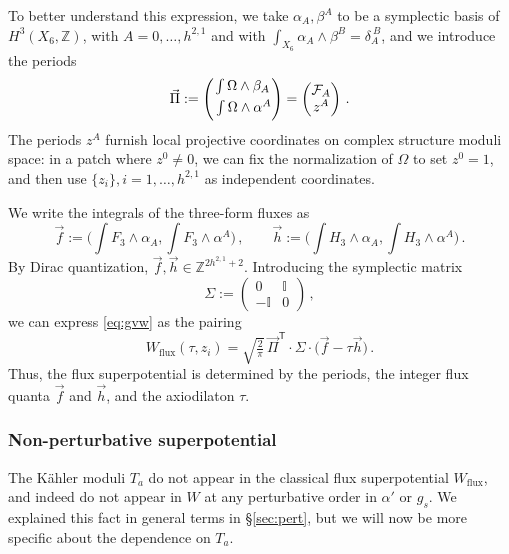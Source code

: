 \documentclass[12pt,a4wide]{article}
\begin{document}
To better understand this expression,
we take $\alpha_A, \beta^A$ to be a symplectic basis of $H^3(X_6,\mathbb{Z})$, with $A=0,\ldots, h^{2,1}$ and with $\int_{X_6}\alpha_A \wedge \beta^B = \delta_{A}^{~B}$, and
we introduce the periods
\begin{equation}\label{eq:perioddef}
\vec{\Pi}:=\begin{pmatrix}
\int\Omega\wedge \beta_A \\
\phantom{\Bigl.}\int\Omega\wedge \alpha^A
\end{pmatrix}=\begin{pmatrix}
\mathcal{F}_A\\
z^A
\end{pmatrix}\, .
\end{equation}
The periods $z^A$ furnish local projective coordinates on complex structure moduli space: in a patch where $z^0 \neq 0$, we can fix the normalization of $\Omega$ to set $z^0=1$, and then use $\{z_i\}, i=1,\ldots,h^{2,1}$ as independent coordinates.

We write the integrals of the three-form fluxes as
\begin{equation}\label{eq:fhdef}
    \vec{f} := \biggl(\int F_3 \wedge \alpha_A, \int F_3 \wedge \alpha^A\biggr)\,, \qquad  \vec{h} := \biggl(\int H_3 \wedge \alpha_A, \int H_3 \wedge \alpha^A\biggr)\,.
\end{equation}
By Dirac quantization, $\vec{f}, \vec{h} \in \mathbb{Z}^{2h^{2,1}+2}$.
Introducing the symplectic matrix
\begin{equation} \label{eq:sigdef}
\Sigma:=
\begin{pmatrix} 0 & {\mathbb{I}}\\
-{\mathbb{I}} & 0
\end{pmatrix}\,,
\end{equation}
we can express \eqref{eq:gvw} as the pairing
\begin{equation}\label{eq:fdotpi}
   W_{\text{flux}}(\tau,z_i) = \sqrt{\tfrac{2}{\pi}}\,\vec{\Pi}^{\mathsf{T}}{\cdot}\Sigma{\cdot}\bigl(\vec{f}-\tau\vec{h}\bigr)\,.
\end{equation}
Thus, the flux superpotential is determined by the periods, the integer flux quanta $\vec{f}$ and $\vec{h}$, and the axiodilaton $\tau$.
 

\subsubsection{Non-perturbative superpotential}\label{sss:wnp}

The K\"ahler moduli $T_a$ do not appear in the classical flux superpotential $W_{\text{flux}}$, and indeed do not appear in $W$ at any perturbative order in $\alpha'$ or $g_s$.  We explained this fact in general terms in \S\ref{sec:pert}, but we will now be more specific about the dependence on $T_a$.
\end{document}
